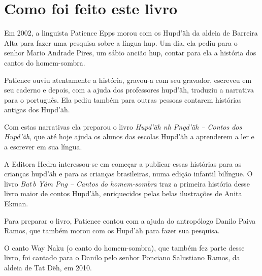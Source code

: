 \chapter{Como foi feito este livro}

Em 2002, a linguista Patience Epps morou com os Hupd’äh da aldeia de Barreira Alta para fazer uma pesquisa sobre a língua hup. Um dia, ela pediu para o senhor Mario Andrade Pires, um sábio ancião hup, contar para ela a história dos cantos do homem-sombra.

Patience ouviu atentamente a história, gravou-a com seu gravador, escreveu em seu caderno e depois, com a ajuda dos professores hupd’äh, traduziu a narrativa para o português. Ela pediu também para outras pessoas contarem histórias antigas dos Hupd’äh.

Com estas narrativas ela preparou o livro \textit{Hupd’äh n\ii{}h P\ii{}n\II{}gd’äh -- Contos
dos Hupd’äh}, que até hoje ajuda os alunos das escolas Hupd’äh a aprenderem a ler e a escrever em sua língua.

A Editora Hedra interessou-se em começar a publicar essas histórias para as crianças hupd’äh e para as crianças brasileiras, numa edição infantil bilíngue. O livro \textit{Bat\II{}\,b Yám P\ii n\II g -- Cantos do homem-sombra} traz a primeira história desse livro maior de contos
Hupd’äh, enriquecidos pelas belas ilustrações de Anita Ekman.

Para preparar o livro, Patience contou com a ajuda do antropólogo Danilo Paiva Ramos, que também morou com os Hupd’äh para fazer sua pesquisa.

O canto Way Naku (o canto do homem-sombra), que também fez parte desse livro, foi cantado
para o Danilo pelo senhor Ponciano Salustiano Ramos, da aldeia de Tat Dëh, em 2010.


